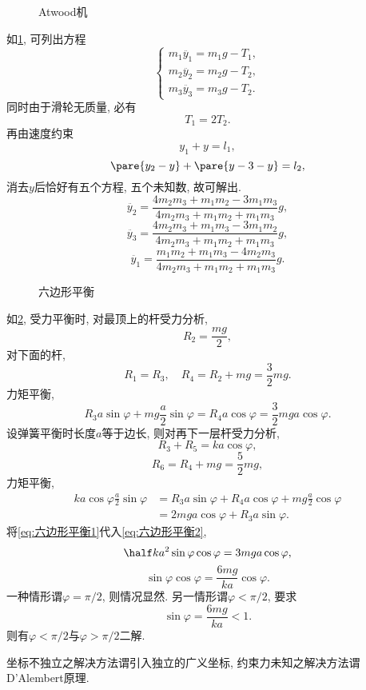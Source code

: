 \documentclass[../LectureNotes.tex]{subfiles}
\begin{document}
\begin{figure}[ht]
    \centering
    \caption{Atwood机}
    \label{fig:Atwood机}
\end{figure}
\begin{ex}[Atwood机]
    \label{ex:Atwood机}
    如\cref{fig:Atwood机}, 可列出方程
    \[ \begin{cases}
        m_1\ddot{y_1} = m_1g - T_1,\\
        m_2\ddot{y_2} = m_2g - T_2,\\
        m_3\ddot{y_3} = m_3g - T_2.
    \end{cases} \]
    同时由于滑轮无质量, 必有
    \[ T_1 = 2T_2. \]
    再由速度约束
    \[ y_1 + y = l_1, \]
    \[ \pare{y_2 - y} + \pare{y-3 - y} = l_2, \]
    消去$y$后恰好有五个方程, 五个未知数, 故可解出.
    \[ \boxed{\ddot{y_2} = \frac{4m_2m_3 + m_1m_2 - 3m_1m_3}{4m_2m_3 + m_1m_2 + m_1m_3}g,}\]
    \[ \boxed{\ddot{y_3}=\frac{4m_2m_3 + m_1m_3 - 3m_1m_2}{4m_2m_3 + m_1m_2 + m_1m_3}g,}\]
    \[ \boxed{\ddot{y_1} = \frac{m_1m_2 + m_1m_3 - 4m_2m_3}{4m_2m_3 + m_1m_2 + m_1m_3}g.} \]
\end{ex}
\begin{figure}[ht]
    \centering
    \caption{六边形平衡}
    \label{fig:六边形平衡}
\end{figure}
\begin{ex}
    如\cref{fig:六边形平衡}, 受力平衡时, 对最顶上的杆受力分析,
    \[ R_2 = \frac{mg}{2}, \]
    对下面的杆,
    \[ R_1 = R_3, \quad R_4 = R_2 + mg = \frac{3}{2}mg. \]
    力矩平衡,
    \begin{equation}
        \label{eq:六边形平衡1}
        R_3 a\sin\varphi + mg\frac{a}{2}\sin\varphi = R_4 a\cos\varphi = \frac{3}{2}mga\cos\varphi. 
    \end{equation}
    设弹簧平衡时长度$a$等于边长, 则对再下一层杆受力分析,
    \[ R_3 + R_5 = ka\cos\varphi, \]
    \[ R_6 = R_4 + mg = \frac{5}{2}mg, \]
    力矩平衡,
    \begin{align}
        ka\cos\varphi \frac{a}{2}\sin\varphi &= R_3 a\sin\varphi + R_4 a\cos\varphi + mg \frac{a}{2}\cos\varphi \\
        \label{eq:六边形平衡2}
        &= 2mga\cos\varphi + R_3 a\sin\varphi. 
    \end{align}
    将\eqref{eq:六边形平衡1}代入\eqref{eq:六边形平衡2},
    \[ \half ka^2\sin\varphi\cos\varphi = 3mga\cos\varphi, \]
    \[ \sin \varphi \cos\varphi = \frac{6mg}{ka}\cos\varphi. \]
    一种情形谓$\varphi = \pi/2$, 则情况显然. 另一情形谓$\varphi < \pi/2$, 要求
    \[ \sin\varphi = \frac{6mg}{ka} < 1. \]
    则有$\varphi <\pi/2$与$\varphi > \pi/2$二解.
\end{ex}
坐标不独立之解决方法谓引入独立的广义坐标, 约束力未知之解决方法谓D'Alembert原理.
\end{document}
